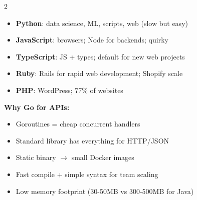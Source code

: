 \documentclass[11pt, letterpaper]{article}
\begin{document}
\begin{tcolorbox}[colback=part2bg, colframe=sectiongreen,
  title={\bfseries Scripting/Dynamic Languages}, arc=3pt, boxrule=1pt]
\footnotesize
\begin{multicols}{2}
\begin{itemize}[noitemsep, leftmargin=*]
  \item \textbf{Python}: data science, ML, scripts, web (slow but easy)
  \item \textbf{JavaScript}: browsers; Node for backends; quirky
  \item \textbf{TypeScript}: JS + types; default for new web projects
  \item \textbf{Ruby}: Rails for rapid web development; Shopify scale
  \item \textbf{PHP}: WordPress; 77\% of websites
\end{itemize}
\columnbreak
\textbf{Why Go for APIs:}
\begin{itemize}[noitemsep, leftmargin=*]
  \item Goroutines = cheap concurrent handlers
  \item Standard library has everything for HTTP/JSON
  \item Static binary $\to$ small Docker images
  \item Fast compile + simple syntax for team scaling
  \item Low memory footprint (30-50MB vs 300-500MB for Java)
\end{itemize}
\end{multicols}
\end{tcolorbox}

\vspace{4pt}
\end{document}
